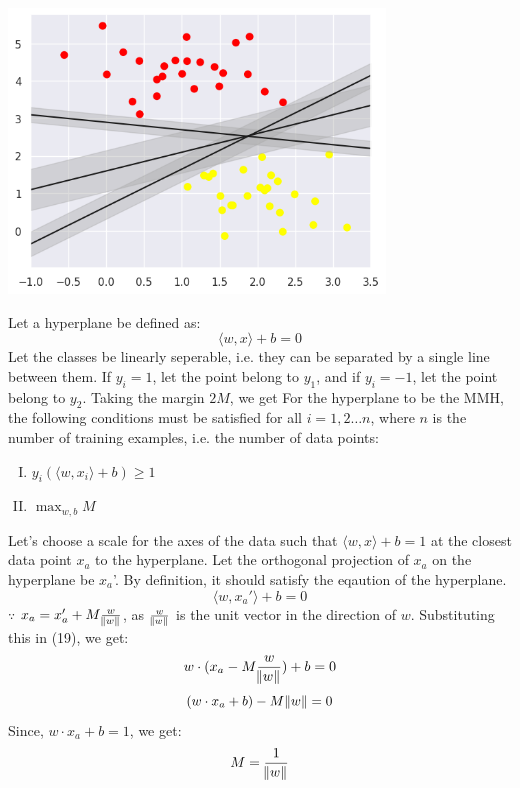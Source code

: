 \documentclass[12pt]{article}
\newcommand{\innerproduct}[2]{\langle#1, #2 \rangle}
\begin{document}
\begin{center}
    \includegraphics[width=10cm]{svm-margin.png}
\end{center}
Let a hyperplane be defined as:
\begin{equation*}
    \innerproduct{w}{x} + b = 0
\end{equation*}
Let the classes be linearly seperable, i.e. they can be separated by a single line between them. If $y_i = 1$, let the point belong to $y_1$, and if $y_i = -1$, let the point belong to $y_2$. Taking  the margin $2M$, we get 
For the hyperplane to be the MMH, the following conditions must be satisfied for all $i=1,2 \dots n$, where $n$ is the number of training examples, i.e. the number of data points:
\begin{enumerate}[(I)]
    \item $y_i(\innerproduct{w}{x_i} + b) \geq 1$ 
    \item $\max_{w,b} M$
\end{enumerate}
Let's choose a scale for the axes of the data such that $\innerproduct{w}{x} +b = 1$ at the closest data point $x_a$ to the hyperplane. Let the orthogonal projection of $x_a$ on the hyperplane be $x_a$'. By definition, it should satisfy the eqaution of the hyperplane.
\begin{equation}
    \innerproduct{w}{x_a'} + b = 0
\end{equation}
$\because$ $x_a = x_a' + M\frac{w}{\norm{w}}$, as $\frac{w}{\norm{w}}$ is the unit vector in the direction of $w$. Substituting this in (19), we get:
\begin{equation*}
    w \cdot (x_a - M\frac{w}{\norm{w}}) + b = 0
\end{equation*}
\begin{equation*}
    (w \cdot x_a + b) - M\norm{w} = 0
\end{equation*}
Since, $w \cdot x_a + b = 1$, we get:
\begin{equation}
    M = \frac{1}{\norm{w}}
\end{equation}
\end{document}
